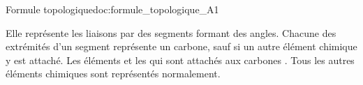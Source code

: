 \begin{doc}{Formule topologique}{doc:formule_topologique_A1}
  \begin{encart}  
    Elle représente les liaisons  par des segments formant des angles.
    Chacune des extrémités d'un segment représente un carbone, sauf si un autre élément chimique y est attaché.
    Les éléments  et les  qui sont attachés aux carbones .
    Tous les autres éléments chimiques sont représentés normalement.
  \end{encart}

  \exemples
  \vspace*{-20pt}
  \begin{center}
    \qq{}
    \qq{}
  \end{center}
\end{doc}

